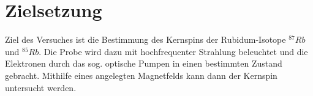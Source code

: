 \section{Zielsetzung}
\label{sec:Zielsetzung}
Ziel des Versuches ist die Bestimmung des Kernspins der Rubidum-Isotope $^{87}Rb$ und $^{85}Rb$.
Die Probe wird dazu mit hochfrequenter Strahlung beleuchtet und die Elektronen durch das sog. optische Pumpen in einen bestimmten Zustand gebracht.
Mithilfe eines angelegten Magnetfelds kann dann der Kernspin untersucht werden.